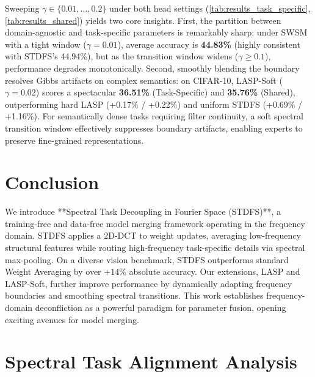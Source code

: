\documentclass{article}
\theoremstyle{plain}
\theoremstyle{definition}
\theoremstyle{remark}
\begin{document}
Sweeping $\gamma \in \{0.01, \dots, 0.2\}$ under both head settings (\cref{tab:results_task_specific}, \cref{tab:results_shared}) yields two core insights. First, the partition between domain-agnostic and task-specific parameters is remarkably sharp: under SWSM with a tight window ($\gamma=0.01$), average accuracy is \textbf{44.83\%} (highly consistent with STDFS's 44.94\%), but as the transition window widens ($\gamma \ge 0.1$), performance degrades monotonically. Second, smoothly blending the boundary resolves Gibbs artifacts on complex semantics: on CIFAR-10, LASP-Soft ($\gamma=0.02$) scores a spectacular \textbf{36.51\%} (Task-Specific) and \textbf{35.76\%} (Shared), outperforming hard LASP (+0.17\% / +0.22\%) and uniform STDFS (+0.69\% / +1.16\%). For semantically dense tasks requiring filter continuity, a soft spectral transition window effectively suppresses boundary artifacts, enabling experts to preserve fine-grained representations.

\section{Conclusion}
\label{sec:conclusion}
We introduce **Spectral Task Decoupling in Fourier Space (STDFS)**, a training-free and data-free model merging framework operating in the frequency domain. STDFS applies a 2D-DCT to weight updates, averaging low-frequency structural features while routing high-frequency task-specific details via spectral max-pooling. On a diverse vision benchmark, STDFS outperforms standard Weight Averaging by over $+14\%$ absolute accuracy. Our extensions, LASP and LASP-Soft, further improve performance by dynamically adapting frequency boundaries and smoothing spectral transitions. This work establishes frequency-domain deconfliction as a powerful paradigm for parameter fusion, opening exciting avenues for model merging.




\clearpage
\appendix
\onecolumn
\section{Spectral Task Alignment Analysis}
\label{app:spectral_similarity}
\end{document}
